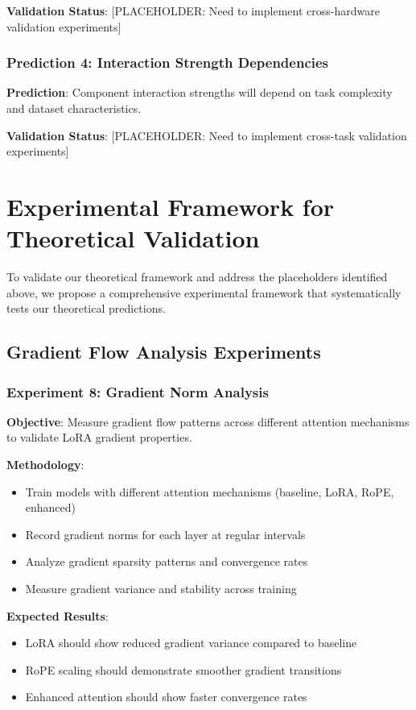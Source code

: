 \documentclass[11pt,a4paper]{article}
\begin{document}
\textbf{Validation Status}: [PLACEHOLDER: Need to implement cross-hardware validation experiments]

\subsubsection{Prediction 4: Interaction Strength Dependencies}
\textbf{Prediction}: Component interaction strengths will depend on task complexity and dataset characteristics.

\textbf{Validation Status}: [PLACEHOLDER: Need to implement cross-task validation experiments]

\section{Experimental Framework for Theoretical Validation}

To validate our theoretical framework and address the placeholders identified above, we propose a comprehensive experimental framework that systematically tests our theoretical predictions.

\subsection{Gradient Flow Analysis Experiments}

\subsubsection{Experiment 8: Gradient Norm Analysis}
\textbf{Objective}: Measure gradient flow patterns across different attention mechanisms to validate LoRA gradient properties.

\textbf{Methodology}:
\begin{itemize}
    \item Train models with different attention mechanisms (baseline, LoRA, RoPE, enhanced)
    \item Record gradient norms for each layer at regular intervals
    \item Analyze gradient sparsity patterns and convergence rates
    \item Measure gradient variance and stability across training
\end{itemize}

\textbf{Expected Results}: 
\begin{itemize}
    \item LoRA should show reduced gradient variance compared to baseline
    \item RoPE scaling should demonstrate smoother gradient transitions
    \item Enhanced attention should show faster convergence rates
\end{itemize}
\end{document}
